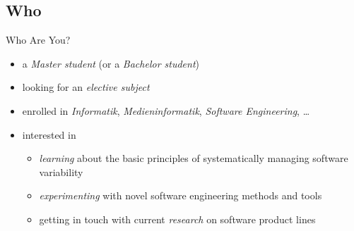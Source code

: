 \newcommand{\ulmMoodleLink}{https://moodle.uni-ulm.de/course/view.php?id=37352}
\newcommand{\ulmCalendarLink}{https://moodle.uni-ulm.de/calendar/view.php?view=upcoming&course=37352}
\newcommand{\ulmMoodle}{\href{\ulmMoodleLink}{Moodle}}

\subsection{Who}

\begin{frame}{\myframetitle}
	\begin{mycolumns}[animation=none]
		\begin{example}{Who Are You?}
			\begin{itemize}
				\item a \emph{Master student} (or a \emph{Bachelor student})
				\item looking for an \emph{elective subject} 
				\item enrolled in \emph{Informatik}, \emph{Medieninformatik}, \emph{Software Engineering}, \ldots
				\item interested in
				\begin{itemize}
					\item \emph{learning} about the basic principles of systematically managing software variability
					\item \emph{experimenting} with novel software engineering methods and tools
					\item getting in touch with current \emph{research} on software product lines
				\end{itemize}
			\end{itemize}
		\end{example}
	\mynextcolumn
	\end{mycolumns}
\end{frame}

